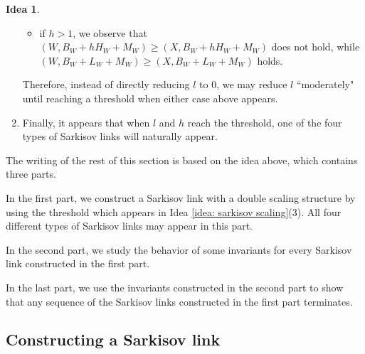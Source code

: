 \documentclass[11pt]{amsart}
\numberwithin{equation}{section}
\theoremstyle{definition}
\newtheorem{idea}[thm]{Idea}
\theoremstyle{remark}
\theoremstyle{definition}
\begin{document}
\begin{idea}
\begin{enumerate}
\begin{itemize}
        \item if $h>1$, we observe that $(W,B_W+hH_W+M_W)\geq (X,B_W+hH_W+M_W)$ does not hold, while $(W,B_W+L_W+M_W)\geq (X,B_W+L_W+M_W)$ holds.
    \end{itemize}
    Therefore, instead of directly reducing $l$ to $0$, we may reduce $l$ ``moderately" until reaching a threshold when either case above appears.
    \item Finally, it appears that when $l$ and $h$ reach the threshold, one of the four types of Sarkisov links will naturally appear. 
    \end{enumerate}
\end{idea}

The writing of the rest of this section is based on the idea above, which contains three parts.

In the first part, we construct a Sarkisov link with a double scaling structure by using the threshold which appears in Idea \ref{idea: sarkisov scaling}(3). All four different types of Sarkisov links may appear in this part.

In the second part, we study the behavior of some invariants for every Sarkisov link constructed in the first part. 

In the last part, we use the invariants constructed in the second part to show that any sequence of the Sarkisov links constructed in the first part terminates.

\subsection{Constructing a Sarkisov link}
\end{document}
